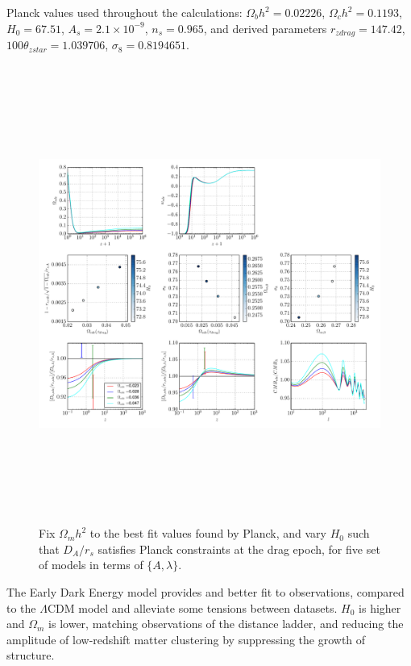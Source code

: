 \documentclass[preprintnumbers,amsmath,amssymb,prd,superscriptaddress,notitlepag
e, twocolumn]{revtex4-1}
\begin{document}
Planck values used throughout the calculations:  $\Omega_{b}h^2 = 0.02226$,  $\Omega_{c}h^2 =0.1193$, 
$H_0 = 67.51$, $A_{s} =2.1\times10^{-9}$, $n_{s}= 0.965$, and derived parameters 
$r_{zdrag}=147.42$, $100\theta_{zstar}=1.039706$, $\sigma_8 = 0.8194651 $.

\begin{figure}[h!]
\hspace*{-0.in}
  \includegraphics[trim = 2mm 2mm 3mm 1mm, clip, width=18cm, height=15cm]{test_quint_Om.pdf}
 \caption{Fix
 $\Omega_{m}h^2$  to the best fit values found
by Planck, and vary $H_0$ such that $D_A/r_s$ satisfies Planck constraints at the drag epoch, for five set of models 
in terms of $\{A, \lambda\}$. }
 \label{fig:fig1}
\end{figure} 


The Early Dark Energy model  provides and better fit to observations, compared to the $\Lambda$CDM model
and alleviate some tensions between datasets. $H_0$ is higher and $\Omega_m$ is lower, 
 matching observations of the distance ladder, and reducing the amplitude of low-redshift matter clustering
 by suppressing the growth of structure.
 
\end{document}
